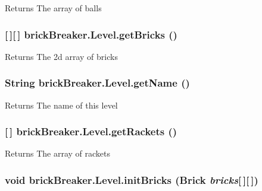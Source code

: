 \label{classbrick_breaker_1_1_level_aabd74f57cf3043d6bae8b98953344e4b}
\begin{DoxyReturn}{Returns}
The array of balls 
\end{DoxyReturn}
\hypertarget{classbrick_breaker_1_1_level_a32fa1d0bdac9b8fc1b0256b793ebeb8c}{
\subsubsection[{getBricks}]{ \mbox{[}$\,$\mbox{]}\mbox{[}$\,$\mbox{]} brickBreaker.Level.getBricks ()}}
\label{classbrick_breaker_1_1_level_a32fa1d0bdac9b8fc1b0256b793ebeb8c}
\begin{DoxyReturn}{Returns}
The 2d array of bricks 
\end{DoxyReturn}
\hypertarget{classbrick_breaker_1_1_level_a3ef4e701ca616ff080c401586e04387b}{
\subsubsection[{getName}]{\setlength{\rightskip}{0pt plus 5cm}String brickBreaker.Level.getName ()}}
\label{classbrick_breaker_1_1_level_a3ef4e701ca616ff080c401586e04387b}
\begin{DoxyReturn}{Returns}
The name of this level 
\end{DoxyReturn}
\hypertarget{classbrick_breaker_1_1_level_abc80d5b2ae6aa9f6884dddef4a08d82b}{
\subsubsection[{getRackets}]{ \mbox{[}$\,$\mbox{]} brickBreaker.Level.getRackets ()}}
\label{classbrick_breaker_1_1_level_abc80d5b2ae6aa9f6884dddef4a08d82b}
\begin{DoxyReturn}{Returns}
The array of rackets 
\end{DoxyReturn}
\hypertarget{classbrick_breaker_1_1_level_a2cf993a57ad58665d34d09b9366a39b4}{
\subsubsection[{initBricks}]{\setlength{\rightskip}{0pt plus 5cm}void brickBreaker.Level.initBricks ({\bf Brick} {\em bricks}\mbox{[}$\,$\mbox{]}\mbox{[}$\,$\mbox{]})}}

